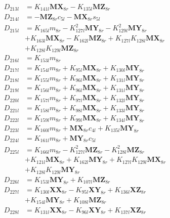 \begin{multicols}{2}
\begin{align}
D_{213l} &= K_{141l}\mathbf{MX}_{8r} - K_{135l}\mathbf{MZ}_{8r} \nonumber \\
D_{214l} &= - \mathbf{MZ}_{8r}c_{5l} - \mathbf{MX}_{8r}s_{5l} \nonumber \\
D_{215l} &= K_{165l}m_{8r} - K_{127l}^2\mathbf{MY}_{8r} - K_{129l}^2\mathbf{MY}_{8r}  \nonumber \\
&+ K_{163l}\mathbf{MX}_{8r} - K_{162l}\mathbf{MZ}_{8r} + K_{127l}K_{128l}\mathbf{MX}_{8r}  \nonumber \\
&+ K_{128l}K_{129l}\mathbf{MZ}_{8r} \nonumber \\
D_{216l} &= K_{153l}m_{8r} \nonumber \\
D_{217l} &= K_{154l}m_{8r} + K_{95l}\mathbf{MX}_{8r} + K_{130l}\mathbf{MY}_{8r} \nonumber \\
D_{218l} &= K_{155l}m_{8r} + K_{96l}\mathbf{MX}_{8r} + K_{131l}\mathbf{MY}_{8r} \nonumber \\
D_{219l} &= K_{156l}m_{8r} + K_{96l}\mathbf{MX}_{8r} + K_{131l}\mathbf{MY}_{8r} \nonumber \\
D_{220l} &= K_{157l}m_{8r} + K_{97l}\mathbf{MX}_{8r} + K_{132l}\mathbf{MY}_{8r} \nonumber \\
D_{221l} &= K_{158l}m_{8r} + K_{98l}\mathbf{MX}_{8r} + K_{133l}\mathbf{MY}_{8r} \nonumber \\
D_{222l} &= K_{159l}m_{8r} + K_{99l}\mathbf{MX}_{8r} + K_{134l}\mathbf{MY}_{8r} \nonumber \\
D_{223l} &= K_{160l}m_{8r} + \mathbf{MX}_{8r}c_{4l} + K_{135l}\mathbf{MY}_{8r} \nonumber \\
D_{224l} &= K_{161l}m_{8r} + \mathbf{MY}_{8r}c_{5l} \nonumber \\
D_{225l} &= K_{166l}m_{8r} - K_{127l}^2\mathbf{MZ}_{8r} - K_{128l}^2\mathbf{MZ}_{8r}  \nonumber \\
&+ K_{121l}\mathbf{MX}_{8r} + K_{162l}\mathbf{MY}_{8r} + K_{127l}K_{129l}\mathbf{MX}_{8r}  \nonumber \\
&+ K_{128l}K_{129l}\mathbf{MY}_{8r} \nonumber \\
D_{226l} &= K_{153l}\mathbf{MY}_{8r} + K_{107l}\mathbf{MZ}_{8r} \nonumber \\
D_{227l} &= K_{130l}\mathbf{XX}_{8r} - K_{95l}\mathbf{XY}_{8r} + K_{136l}\mathbf{XZ}_{8r}  \nonumber \\
&+ K_{154l}\mathbf{MY}_{8r} + K_{108l}\mathbf{MZ}_{8r} \nonumber \\
D_{228l} &= K_{131l}\mathbf{XX}_{8r} - K_{96l}\mathbf{XY}_{8r} + K_{137l}\mathbf{XZ}_{8r}  \nonumber \\

\end{align}
\end{multicols}
